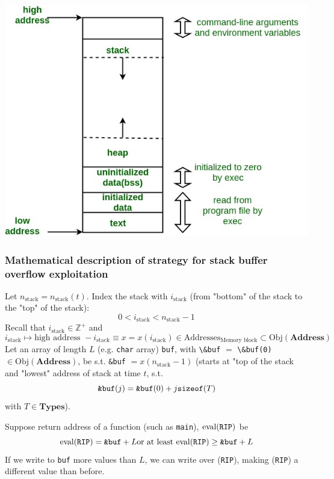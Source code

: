 \documentclass[10pt]{amsart}
\begin{document}
\begin{multicols*}{2}
	 	\includegraphics[totalheight=8cm]{images/Cmemory/memoryLayoutC.jpg}
	\begin{minipage}{.6\textwidth}
		\label{Fig:TypicalCMemoryLayout}
	\end{minipage}



\subsubsection{Mathematical description of strategy for stack buffer overflow exploitation}

Let $n_{\text{stack}} = n_{\text{stack}}(t)$.  Index the stack with $i_{\text{stack}}$ (from "bottom" of the stack to the "top" of the stack):
\[
0 < i_{\text{stack}} < n_{\text{stack}} - 1
\]
Recall that $i_{\text{stack}} \in \mathbb{Z}^+$ and 
\[
i_{\text{stack}} \mapsto \text{high address } - i_{\text{stack}} \equiv x = x(i_{\text{stack}}) \in \text{Addresses}_{\text{Memory block}} \subset \text{Obj}(\textbf{Address})
\]
Let an array of length $L$ (e.g. \verb|char| array) \verb|buf|, with \verb|\&buf| $=$ \verb|\&buf(0)| $\in  \text{Obj}{(\textbf{Address})}$, be s.t. \verb|&buf| $=x(n_{\text{stack}}-1)$ (starts at "top of the stack and "lowest" address of stack at time $t$, s.t. 
\[
\verb|&buf|(j) = \verb|&buf|(0) + j \verb|sizeof|(T)
\]
with $T\in \textbf{Types}$).  


Suppose return address of a function (such as \verb|main|), $\text{eval}(\verb|RIP|)$ be 
\[
\text{eval}(\verb|RIP|) = \verb|&buf| + L \text{or at least } \text{eval}(\verb|RIP|) \geq \verb|&buf| + L
\]
If we write to \verb|buf| more values than $L$, we can write over (\verb|RIP|), making (\verb|RIP|) a different value than before.  





\end{multicols*}
\end{document}

